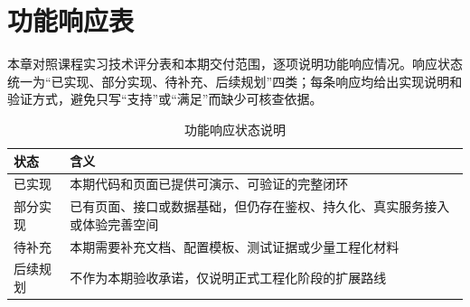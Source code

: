 \section{功能响应表}

本章对照课程实习技术评分表和本期交付范围，逐项说明功能响应情况。响应状态统一为“已实现、部分实现、待补充、后续规划”四类；每条响应均给出实现说明和验证方式，避免只写“支持”或“满足”而缺少可核查依据。

\begin{table}[H]
  \centering
  \caption{功能响应状态说明}
  \label{tab:response-status}
  \begin{tabularx}{0.82\textwidth}{p{2.8cm}|X}
    \toprule
    \textbf{状态} & \textbf{含义} \\
    \midrule
    已实现 & 本期代码和页面已提供可演示、可验证的完整闭环 \\
    \hline
    部分实现 & 已有页面、接口或数据基础，但仍存在鉴权、持久化、真实服务接入或体验完善空间 \\
    \hline
    待补充 & 本期需要补充文档、配置模板、测试证据或少量工程化材料 \\
    \hline
    后续规划 & 不作为本期验收承诺，仅说明正式工程化阶段的扩展路线 \\
    \bottomrule
  \end{tabularx}
\end{table}

